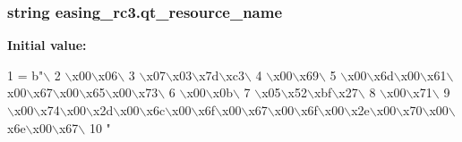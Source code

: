 \subsubsection[{qt\+\_\+resource\+\_\+name}]{\setlength{\rightskip}{0pt plus 5cm}string easing\+\_\+rc3.\+qt\+\_\+resource\+\_\+name}\label{namespaceeasing__rc3_af707758d63dbb36f089bd1ce8c5c22e9}
{\bfseries Initial value\+:}
\begin{DoxyCode}
1 = b\textcolor{stringliteral}{"\(\backslash\)}
2 \textcolor{stringliteral}{\(\backslash\)x00\(\backslash\)x06\(\backslash\)}
3 \textcolor{stringliteral}{\(\backslash\)x07\(\backslash\)x03\(\backslash\)x7d\(\backslash\)xc3\(\backslash\)}
4 \textcolor{stringliteral}{\(\backslash\)x00\(\backslash\)x69\(\backslash\)}
5 \textcolor{stringliteral}{\(\backslash\)x00\(\backslash\)x6d\(\backslash\)x00\(\backslash\)x61\(\backslash\)x00\(\backslash\)x67\(\backslash\)x00\(\backslash\)x65\(\backslash\)x00\(\backslash\)x73\(\backslash\)}
6 \textcolor{stringliteral}{\(\backslash\)x00\(\backslash\)x0b\(\backslash\)}
7 \textcolor{stringliteral}{\(\backslash\)x05\(\backslash\)x52\(\backslash\)xbf\(\backslash\)x27\(\backslash\)}
8 \textcolor{stringliteral}{\(\backslash\)x00\(\backslash\)x71\(\backslash\)}
9 \textcolor{stringliteral}{\(\backslash\)x00\(\backslash\)x74\(\backslash\)x00\(\backslash\)x2d\(\backslash\)x00\(\backslash\)x6c\(\backslash\)x00\(\backslash\)x6f\(\backslash\)x00\(\backslash\)x67\(\backslash\)x00\(\backslash\)x6f\(\backslash\)x00\(\backslash\)x2e\(\backslash\)x00\(\backslash\)x70\(\backslash\)x00\(\backslash\)x6e\(\backslash\)x00\(\backslash\)x67\(\backslash\)}
10 \textcolor{stringliteral}{"}
\end{DoxyCode}
\hypertarget{namespaceeasing__rc3_a028b8ff7a046b5fb8236206ad48c71ee}{}
